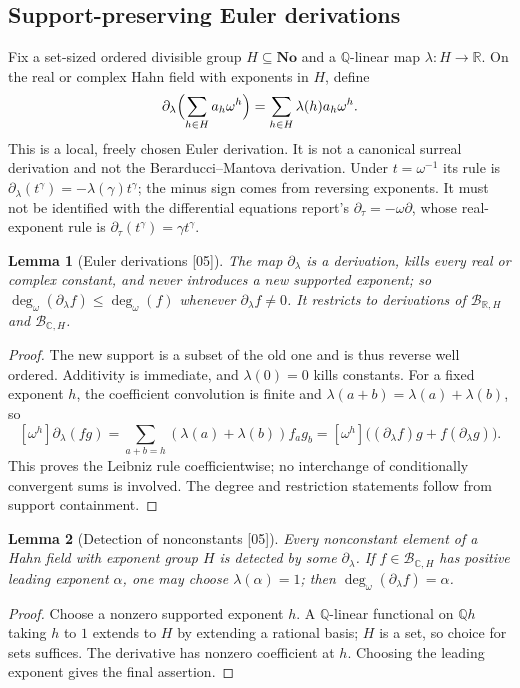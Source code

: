 \documentclass[11pt,oneside]{article}
\numberwithin{equation}{section}
\newtheorem{lemma}[lemma]{Lemma}
\theoremstyle{definition}
\theoremstyle{remark}
\newcommand{\No}{\mathbf{No}}
\newcommand{\Q}{\mathbb Q}
\newcommand{\R}{\mathbb R}
\newcommand{\C}{\mathbb C}
\newcommand{\ddeg}{\operatorname{deg}_{\omega}}
\newcommand{\src}[1]{\textup{\textsf{\small[#1]}}}
\begin{document}
\subsection{Support-preserving Euler derivations}

Fix a set-sized ordered divisible group $H\subseteq\No$ and a $\Q$-linear
map $\lambda:H\to\R$. On the real or complex Hahn field with exponents in
$H$, define
\begin{equation}\label{odg:eq:euler}
 \partial_\lambda\Bigl(\sum_{h\in H}a_h\omega^h\Bigr)
   =\sum_{h\in H}\lambda(h)a_h\omega^h.
\end{equation}
This is a local, freely chosen Euler derivation. It is not a canonical
surreal derivation and not the Berarducci--Mantova derivation. Under
$t=\omega^{-1}$ its rule is
$\partial_\lambda(t^\gamma)=-\lambda(\gamma)t^\gamma$; the minus sign comes
from reversing exponents. It must not be identified with the differential
equations report's $\partial_\tau=-\omega\partial$, whose real-exponent rule
is $\partial_\tau(t^\gamma)=\gamma t^\gamma$.

\begin{lemma}[Euler derivations \src{05}]\label{odg:lem:derivation}
The map $\partial_\lambda$ is a derivation, kills every real or complex
constant, and never introduces a new supported exponent; so
$\ddeg(\partial_\lambda f)\le\ddeg(f)$ whenever $\partial_\lambda f\ne0$.
It restricts to derivations of $\mathcal B_{\R,H}$ and $\mathcal B_{\C,H}$.
\end{lemma}
\begin{proof}
The new support is a subset of the old one and is thus reverse well
ordered. Additivity is immediate, and $\lambda(0)=0$ kills constants. For a
fixed exponent $h$, the coefficient convolution is finite and
$\lambda(a+b)=\lambda(a)+\lambda(b)$, so
\[
 [\omega^h]\partial_\lambda(fg)
 =\sum_{a+b=h}(\lambda(a)+\lambda(b))f_a g_b
 =[\omega^h]\bigl((\partial_\lambda f)g+f(\partial_\lambda g)\bigr).
\]
This proves the Leibniz rule coefficientwise; no interchange of conditionally
convergent sums is involved. The degree and restriction statements follow
from support containment.
\end{proof}

\begin{lemma}[Detection of nonconstants \src{05}]\label{odg:lem:detection}
Every nonconstant element of a Hahn field with exponent group $H$ is
detected by some $\partial_\lambda$. If $f\in\mathcal B_{\C,H}$ has positive
leading exponent $\alpha$, one may choose $\lambda(\alpha)=1$; then
$\ddeg(\partial_\lambda f)=\alpha$.
\end{lemma}
\begin{proof}
Choose a nonzero supported exponent $h$. A $\Q$-linear functional on $\Q h$
taking $h$ to $1$ extends to $H$ by extending a rational basis; $H$ is a
set, so choice for sets suffices. The derivative has nonzero coefficient at
$h$. Choosing the leading exponent gives the final assertion.
\end{proof}
\end{document}
